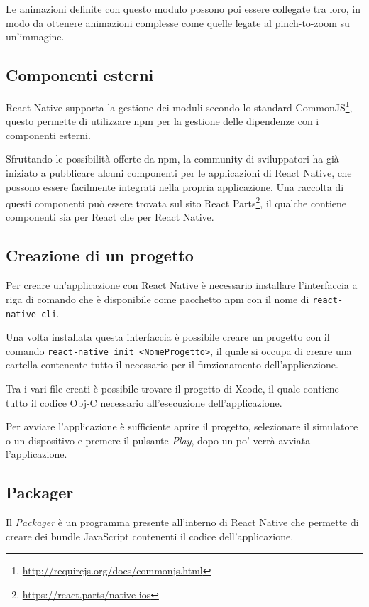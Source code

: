 Le animazioni definite con questo modulo possono poi essere collegate tra loro, in modo da ottenere animazioni complesse come quelle legate al \gls{pinch-to-zoom} su un'immagine.

\subsection{Componenti esterni}

React Native supporta la gestione dei moduli secondo lo standard CommonJS\footnote{\url{http://requirejs.org/docs/commonjs.html}}, questo permette di utilizzare npm per la gestione delle dipendenze con i componenti esterni.

Sfruttando le possibilità offerte da npm, la community di sviluppatori ha già iniziato a pubblicare alcuni componenti per le applicazioni di React Native, che possono essere facilmente integrati nella propria applicazione.
Una raccolta di questi componenti può essere trovata sul sito React Parts\footnote{\url{https://react.parts/native-ios}}, il qualche contiene componenti sia per React che per React Native.

\subsection{Creazione di un progetto}

Per creare un'applicazione con React Native è necessario installare l'interfaccia a riga di comando che è disponibile come pacchetto npm con il nome di \texttt{react-native-cli}.

Una volta installata questa interfaccia è possibile creare un progetto con il comando \texttt{react-native init <NomeProgetto>}, il quale si occupa di creare una cartella contenente tutto il necessario per il funzionamento dell'applicazione.

Tra i vari file creati è possibile trovare il progetto di Xcode, il quale contiene tutto il codice Obj-C necessario all'esecuzione dell'applicazione.

Per avviare l'applicazione è sufficiente aprire il progetto, selezionare il simulatore o un dispositivo e premere il pulsante \textit{Play}, dopo un po' verrà avviata l'applicazione.

\subsection{Packager}\label{sec:packager}

Il \textit{Packager} è un programma presente all'interno di React Native che permette di creare dei bundle JavaScript contenenti il codice dell'applicazione.

